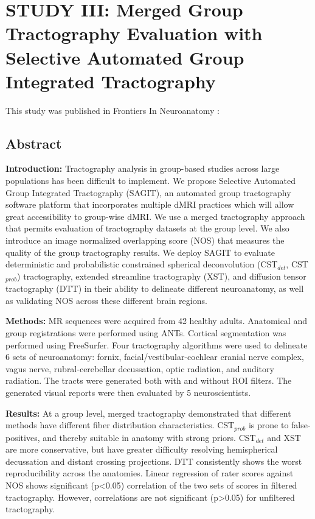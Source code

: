 \graphicspath{{images/sagit/}}

\chapter{STUDY III: Merged Group Tractography Evaluation with Selective Automated Group Integrated Tractography}
\label{section:study3}

This study was published in Frontiers In Neuroanatomy :


\section{Abstract }
\textbf{Introduction:} Tractography analysis in group-based studies across large populations has been difficult to implement. We propose Selective Automated Group Integrated Tractography (SAGIT), an automated group tractography software platform that incorporates multiple dMRI practices which will allow great accessibility to group-wise dMRI. We use a merged tractography approach that permits evaluation of tractography datasets at the group level.  We also introduce an image normalized overlapping score (NOS) that measures the quality of the group tractography results. We deploy SAGIT to evaluate deterministic and probabilistic constrained spherical deconvolution (CST$_{det}$, CST$_{prob}$) tractography, extended streamline tractography (XST), and diffusion tensor tractography (DTT) in their ability to delineate different neuroanatomy, as well as validating NOS across these different brain regions. 

\textbf{Methods:} MR sequences were acquired from 42 healthy adults. Anatomical and group registrations were performed using ANTs. Cortical segmentation was performed using FreeSurfer. Four tractography algorithms were used to delineate 6 sets of neuroanatomy: fornix, facial/vestibular-cochlear cranial nerve complex, vagus nerve, rubral-cerebellar decussation, optic radiation, and auditory radiation. The tracts were generated both with and without ROI filters. The generated visual reports were then evaluated by 5 neuroscientists. 

\textbf{Results:} At a group level, merged tractography demonstrated that different methods have different fiber distribution characteristics. CST$_{prob}$ is prone to false-positives, and thereby suitable in anatomy with strong priors. CST$_{det}$ and XST are more conservative, but have greater difficulty resolving hemispherical decussation and distant crossing projections. DTT consistently shows the worst reproducibility across the anatomies. Linear regression of rater scores against NOS shows significant (p\textless0.05) correlation of the two sets of scores in filtered tractography. However, correlations are not significant (p\textgreater0.05) for unfiltered tractography.

